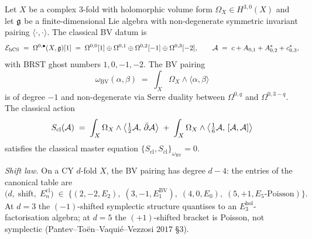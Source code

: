 \begin{theorem}
\label{wn:thm:spine-hCS-classical}
Let $X$ be a complex $3$-fold with holomorphic volume form
$\Omega_X \in H^{3,0}(X)$ and let $\mathfrak{g}$ be a finite-dimensional Lie
algebra with non-degenerate symmetric invariant pairing
$\langle\cdot,\cdot\rangle$. The classical BV datum is
\[
\mathcal{E}_{\mathrm{hCS}} \;=\; \Omega^{0,\bullet}(X, \mathfrak{g})[1]
\;=\;\Omega^{0,0}[1] \oplus \Omega^{0,1} \oplus \Omega^{0,2}[-1]
\oplus \Omega^{0,3}[-2],\qquad
\mathcal{A} \;=\; c + A_{0,1} + A^*_{0,2} + c^*_{0,3},
\]
with BRST ghost numbers $1, 0, -1, -2$. The BV pairing
\[
\omega_{\mathrm{BV}}(\alpha, \beta) \;=\; \int_X \Omega_X \wedge
\langle \alpha, \beta\rangle
\]
is of degree $-1$ and non-degenerate via Serre duality between
$\Omega^{0,q}$ and $\Omega^{0,3-q}$. The classical action
\[
S_{\mathrm{cl}}(\mathcal{A}) \;=\; \int_X \Omega_X \wedge
\bigl\langle \tfrac{1}{2}\mathcal{A},\, \bar\partial \mathcal{A}\bigr\rangle
\;+\; \int_X \Omega_X \wedge
\bigl\langle \tfrac{1}{6}\mathcal{A},\, [\mathcal{A}, \mathcal{A}]\bigr\rangle
\]
satisfies the classical master equation
$\{S_{\mathrm{cl}}, S_{\mathrm{cl}}\}_{\omega_{\mathrm{BV}}} = 0$.

\emph{Shift law.} On a CY $d$-fold $X$, the BV pairing has degree
$d - 4$: the entries of the canonical table are
\[
\bigl(d,\; \mathrm{shift},\; E_n^{\mathrm{cl}}\bigr) \;\in\;
\bigl\{(2, -2, E_2),\; (3, -1, E_1^{\mathrm{BV}}),\; (4, 0, E_0),\;
(5, +1, E_5\text{-Poisson})\bigr\}.
\]
At $d = 3$ the $(-1)$-shifted symplectic structure quantises to an
$E_3^{\mathrm{hol}}$-factorisation algebra; at $d = 5$ the
$(+1)$-shifted bracket is Poisson, not symplectic
(Pantev--To\"en--Vaqui\'e--Vezzosi $2017$ \S3).
\end{theorem}

